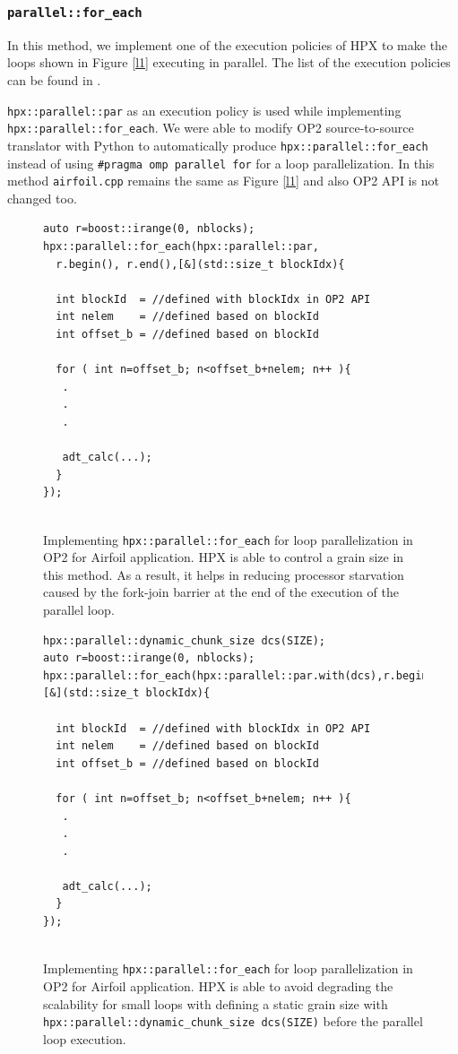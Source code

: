 \documentclass[conference]{IEEEtran}
\begin{document}
\subsubsection{\textbf{\texttt{parallel::for\_each}}}
\label{sec:for}

In this method, we implement one of the execution policies of HPX to make the loops shown in Figure \ref{l1} executing in parallel. The list of the execution policies can be found in \cite{hpx_v0.9.11}. 

\texttt{hpx::parallel::par} as an execution policy is used while implementing \texttt{hpx::parallel::for\_each}. We were able to modify OP2 source-to-source translator with Python to automatically produce \texttt{hpx::parallel::for\_each} instead of using \texttt{\#pragma omp parallel for} for a loop parallelization. In this method \texttt{airfoil.cpp} remains the same as Figure \ref{l1} and also OP2 API is not changed too.

\begin{figure} 
    \begin{lstlisting}    
auto r=boost::irange(0, nblocks);
hpx::parallel::for_each(hpx::parallel::par,
  r.begin(), r.end(),[&](std::size_t blockIdx){
  
  int blockId  = //defined with blockIdx in OP2 API
  int nelem    = //defined based on blockId 
  int offset_b = //defined based on blockId
        
  for ( int n=offset_b; n<offset_b+nelem; n++ ){
   .
   .
   .

   adt_calc(...);
  }
});
  
    \end{lstlisting}
    \caption{\small{Implementing \texttt{hpx::parallel::for\_each} for loop parallelization in OP2 for Airfoil application. HPX is able to control a grain size in this method. As a result, it helps in reducing processor starvation caused by the fork-join barrier at the end of the execution of the parallel loop.}}
    \label{l3}
\end{figure}

\begin{figure} 
    \begin{lstlisting}    
hpx::parallel::dynamic_chunk_size dcs(SIZE);
auto r=boost::irange(0, nblocks);
hpx::parallel::for_each(hpx::parallel::par.with(dcs),r.begin(),r.end(),[&](std::size_t blockIdx){
  
  int blockId  = //defined with blockIdx in OP2 API
  int nelem    = //defined based on blockId 
  int offset_b = //defined based on blockId
        
  for ( int n=offset_b; n<offset_b+nelem; n++ ){
   .
   .
   .

   adt_calc(...);
  }
});
  
    \end{lstlisting}
    \caption{\small{Implementing \texttt{hpx::parallel::for\_each} for loop parallelization in OP2 for Airfoil application. HPX is able to avoid degrading the scalability for small loops with defining a static grain size with \texttt{hpx::parallel::dynamic\_chunk\_size dcs(SIZE)} before the parallel loop execution.}}
    \label{l3b}
\end{figure}
\end{document}
